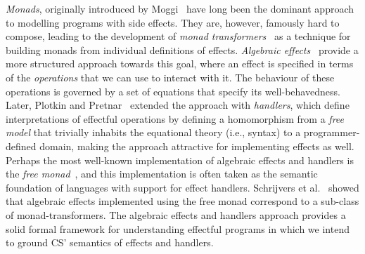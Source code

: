 \documentclass[runningheads]{llncs}
\newcommand{\strachey}{\textsc{CS}}
\begin{document}
\emph{Monads}, originally introduced by Moggi~\cite{DBLP:journals/iandc/Moggi91}
have long been the dominant approach to modelling programs with side
effects. They are, however, famously hard to compose, leading to the development
of \emph{monad transformers}~\cite{DBLP:conf/popl/LiangHJ95} as a technique for
building monads from individual definitions of effects. \emph{Algebraic
  effects}~\cite{DBLP:journals/acs/PlotkinP03} provide a more structured
approach towards this goal, where an effect is specified in terms of the
\emph{operations} that we can use to interact with it. The behaviour of these
operations is governed by a set of equations that specify its
well-behavedness. Later, Plotkin and Pretnar~\cite{DBLP:conf/esop/PlotkinP09}
extended the approach with \emph{handlers}, which define interpretations of
effectful operations by defining a homomorphism from a \emph{free model} that
trivially inhabits the equational theory (i.e., syntax) to a programmer-defined
domain, making the approach attractive for implementing effects as well. Perhaps
the most well-known implementation of algebraic effects and handlers is the
\emph{free monad}~\cite{DBLP:conf/icfp/KammarLO13}, and this implementation is
often taken as the semantic foundation of languages with support for effect
handlers. Schrijvers et al.~\cite{DBLP:conf/haskell/SchrijversPWJ19} showed that
algebraic effects implemented using the free monad correspond to a sub-class of
monad-transformers. The algebraic effects and handlers approach provides a solid
formal framework for understanding effectful programs in which we intend to
ground \strachey{}' semantics of effects and handlers.
\end{document}
